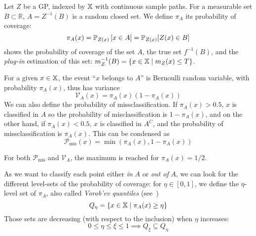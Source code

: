 \documentclass[../../Main_ManuscritThese.tex]{subfiles}
\begin{document}
Let $Z$ be a GP, indexed by $\mathbb{X}$ with continuous sample
paths. For a measurable set $B\subset \mathbb{R}$, $A = Z^{-1}(B)$ is
a random closed set.  We define $\pi_A$ its probability of coverage:
\begin{equation}
  \pi_A(x) = \mathbb{P}_{Z(x)}\left[x\in A\right] = \mathbb{P}_{Z(x)}[Z(x) \in B]
\end{equation}
 shows the probability of coverage of
the set $A$, the true set $f^{-1}(B)$, and the \emph{plug-in} estimation of
this set: $m_Z^{-1}(B) = \{x\in\mathbb{X} \mid m_Z(x) \leq T\}$.

For a given $x\in\mathbb{X}$, the event ``$x$ belongs to $A$'' is
Bernoulli random variable, with probability $\pi_A(x)$, thus has
variance %
\begin{equation}
  \label{eq:bernoulli_cov_variance}
\mathscr{V}_A(x)=\pi_A(x)(1 - \pi_A(x))
\end{equation}
We can also define the probability of missclassification. If
$\pi_A(x) > 0.5$, $x$ is classified in $A$ so the probability of
misclassification is $1-\pi_A(x)$, and on the other hand, if
$\pi_A(x) < 0.5$, $x$ is classified in $A^{C}$, and the probability of
missclassification is $\pi_A(x)$. This can be condensed as
\begin{equation}
\mathscr{P}_{\mathrm{mis}}(x) = \min(\pi_A(x), 1-\pi_A(x))
\end{equation}

For both $\mathscr{P}_{\mathrm{mis}}$ and $\mathscr{V}_A$, the maximum is reached for $\pi_A(x) = 1/2$.

As we want to classify each point either \emph{in} $A$ or \emph{out
  of} $A$, we can look for the different level-sets of the probability
of coverage: for $\eta \in [0, 1]$, we define the $\eta$-level set of
$\pi_A$, also called \emph{Vorob'ev quantiles}
(see~\cite{vorobyev_new_2003})
\begin{equation}
  Q_{\eta} = \{x\in\mathbb{X} \mid \pi_A(x) \geq \eta \}
\end{equation}
Those sets are decreasing (with respect to the inclusion) when $\eta$ increases:
\begin{equation}
  0\leq \eta \leq \xi \leq 1 \implies Q_{\xi} \subseteq Q_{\eta}
\end{equation}
\end{document}
